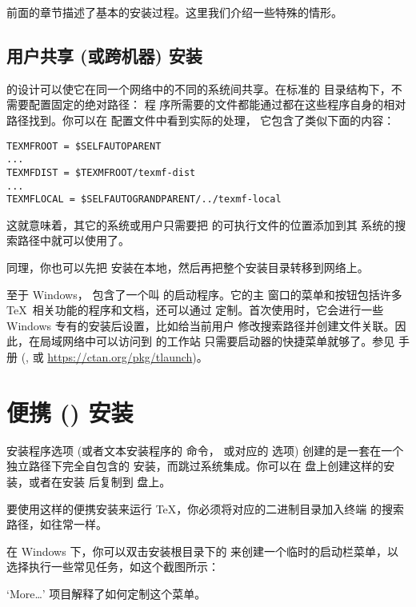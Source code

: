 \documentclass{article}
\begin{document}
前面的章节描述了基本的安装过程。这里我们介绍一些特殊的情形。

\subsection{用户共享 (或跨机器) 安装}
\label{sec:sharedinstall}

\TL{} 的设计可以使它在同一个网络中的不同的系统间共享。在标准的
目录结构下，不需要配置固定的绝对路径：\TL{} 程
序所需要的文件都能通过都在这些程序自身的相对路径找到。你可以在
 配置文件中看到实际的处理，
它包含了类似下面的内容：
\begin{verbatim}
TEXMFROOT = $SELFAUTOPARENT
...
TEXMFDIST = $TEXMFROOT/texmf-dist
...
TEXMFLOCAL = $SELFAUTOGRANDPARENT/../texmf-local
\end{verbatim}
这就意味着，其它的系统或用户只需要把 \TL{} 的可执行文件的位置添加到其
系统的搜索路径中就可以使用了。

同理，你也可以先把 \TL{} 安装在本地，然后再把整个安装目录转移到网络上。

至于 Windows，\TL{} 包含了一个叫  的启动程序。它的主
窗口的菜单和按钮包括许多 \TeX\ 相关功能的程序和文档，还可以通过 
定制。首次使用时，它会进行一些 Windows 专有的安装后设置，比如给当前用户
修改搜索路径并创建文件关联。因此，在局域网络中可以访问到 \TL{} 的工作站
只需要启动器的快捷菜单就够了。参见  手册 (,
或 \url{https://ctan.org/pkg/tlaunch})。

\section{便携 (\USB{}) 安装}
\label{sec:portable-tl}

 安装程序选项 (或者文本安装程序的  命令，
或对应的 \GUI{} 选项) 创建的是一套在一个独立路径下完全自包含的 \TL{}
安装，而跳过系统集成。你可以在 \USB{} 盘上创建这样的安装，或者在安装
后复制到 \USB{} 盘上。

要使用这样的便携安装来运行 \TeX{}，你必须将对应的二进制目录加入终端
的搜索路径，如往常一样。

在 Windows 下，你可以双击安装根目录下的 
来创建一个临时的启动栏菜单，以选择执行一些常见任务，如这个截图所示：

\medskip
{}
\smallskip

\noindent `More\ldots' 项目解释了如何定制这个菜单。
\end{document}
